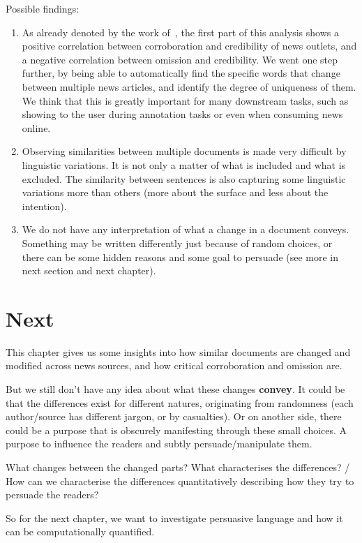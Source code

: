 Possible findings:
\begin{enumerate}
    \item As already denoted by the work of~\citet{bountouridis2018explaining}, the first part of this analysis shows a positive correlation between corroboration and credibility of news outlets, and a negative correlation between omission and credibility. We went one step further, by being able to automatically find the specific words that change between multiple news articles, and identify the degree of uniqueness of them. We think that this is greatly important for many downstream tasks, such as showing to the user during annotation tasks or even when consuming news online. %
    \item Observing similarities between multiple documents is made very difficult by linguistic variations. It is not only a matter of what is included and what is excluded. The similarity between sentences is also capturing some linguistic variations more than others (more about the surface and less about the intention).
    \item We do not have any interpretation of what a change in a document conveys. Something may be written differently just because of random choices, or there can be some hidden reasons and some goal to persuade (see more in next section and next chapter).
\end{enumerate}



\section{Next}
\label{sec:cgs_next}

This chapter gives us some insights into how similar documents are changed and modified across news sources, and how critical corroboration and omission are.



But we still don't have any idea about what these changes \textbf{convey}. It could be that the differences exist for different natures, originating from randomness (each author/source has different jargon, or by casualties).
Or on another side, there could be a purpose that is obscurely manifesting through these small choices. A purpose to influence the readers and subtly persuade/manipulate them.

What changes between the changed parts? What characterises the differences? / How can we characterise the differences quantitatively describing how they try to persuade the readers?

So for the next chapter, we want to investigate persuasive language and how it can be computationally quantified. 
